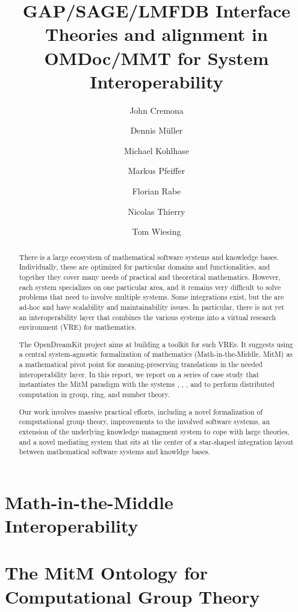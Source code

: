 \documentclass[book]{deliverablereport}
\title{GAP/SAGE/LMFDB Interface Theories and alignment in OMDoc/MMT for System Interoperability}
\author{John Cremona}
\author{Dennis M\"uller}
\author{Michael Kohlhase}
\author{Markus Pfeiffer}
\author{Florian Rabe}
\author{Nicolas Thierry}
\author{Tom Wiesing}
\def\papertype{report\xspace}
\begin{document}
\begin{abstract}
  There is a large ecosystem of mathematical software systems and knowledge bases.
  Individually, these are optimized for particular domains and functionalities, and
  together they cover many needs of practical and theoretical mathematics.  However, each
  system specializes on one particular area, and it remains very difficult to solve
  problems that need to involve multiple systems.  Some integrations exist, but the are
  ad-hoc and have scalability and maintainability issues.  In particular, there is not yet
  an interoperability layer that combines the various systems into a virtual research
  environment (VRE) for mathematics.
  
  The OpenDreamKit project aims at building a toolkit for such VREs.  It suggests using a
  central system-agnostic formalization of mathematics (Math-in-the-Middle, MitM) as a
  mathematical pivot point for meaning-preserving translations in the needed
  interoperability layer.  In this \papertype, we report on a series of case study that
  instantiates the MitM paradigm with the systems \GAP, \Sage, \LMFDB, and
  \Singular{} to perform distributed computation in group,
  ring, and number theory.
 
  Our work involves massive practical efforts, including a novel formalization of
  computational group theory, improvements to the involved software systems, an extension
  of the underlying knowledge managment system to cope with large theories, and a novel
  mediating system that sits at the center of a star-shaped integration layout between
  mathematical software systems and knowldge bases.
\end{abstract}

\maketitle
\newpage\tableofcontents\newpage
{}



\section{Math-in-the-Middle Interoperability}\label{sec:mitm}


\section{The MitM Ontology for Computational Group Theory}\label{sec:cgt}

\end{document}
